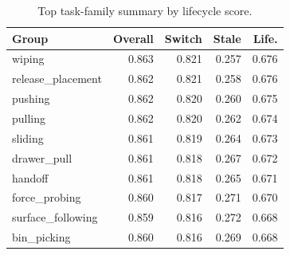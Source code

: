\begin{table}[t]
\centering
\caption{Top task-family summary by lifecycle score.}
\label{tab:task-summary}
\small
\begin{tabular}{lrrrr}
\toprule
Group & Overall & Switch & Stale & Life. \\
\midrule
wiping & 0.863 & 0.821 & 0.257 & 0.676 \\
release\_placement & 0.862 & 0.821 & 0.258 & 0.676 \\
pushing & 0.862 & 0.820 & 0.260 & 0.675 \\
pulling & 0.862 & 0.820 & 0.262 & 0.674 \\
sliding & 0.861 & 0.819 & 0.264 & 0.673 \\
drawer\_pull & 0.861 & 0.818 & 0.267 & 0.672 \\
handoff & 0.861 & 0.818 & 0.265 & 0.671 \\
force\_probing & 0.860 & 0.817 & 0.271 & 0.670 \\
surface\_following & 0.859 & 0.816 & 0.272 & 0.668 \\
bin\_picking & 0.860 & 0.816 & 0.269 & 0.668 \\
\bottomrule
\end{tabular}
\end{table}

